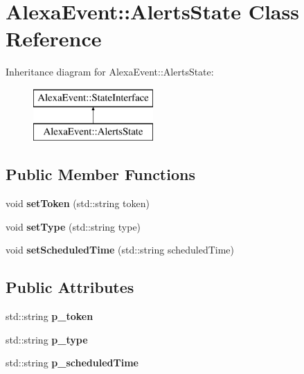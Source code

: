 \hypertarget{classAlexaEvent_1_1AlertsState}{}\section{Alexa\+Event\+:\+:Alerts\+State Class Reference}
\label{classAlexaEvent_1_1AlertsState}
Inheritance diagram for Alexa\+Event\+:\+:Alerts\+State\+:\begin{figure}[H]
\begin{center}
\leavevmode
\includegraphics[height=2.000000cm]{db/d5c/classAlexaEvent_1_1AlertsState}
\end{center}
\end{figure}
\subsection*{Public Member Functions}
\begin{DoxyCompactItemize}
\item 
\mbox{\label{classAlexaEvent_1_1AlertsState_a4fac87f4b2189d9c48388423e35fdccf}} 
void {\bfseries set\+Token} (std\+::string token)
\item 
\mbox{\label{classAlexaEvent_1_1AlertsState_a5e77db6f161f7b8749262cb673e329cd}} 
void {\bfseries set\+Type} (std\+::string type)
\item 
\mbox{\label{classAlexaEvent_1_1AlertsState_ae3dab79db155ebe5e127020706e7dc67}} 
void {\bfseries set\+Scheduled\+Time} (std\+::string scheduled\+Time)
\end{DoxyCompactItemize}
\subsection*{Public Attributes}
\begin{DoxyCompactItemize}
\item 
\mbox{\label{classAlexaEvent_1_1AlertsState_ab201bbf8df1bd53975c2673f3567099a}} 
std\+::string {\bfseries p\+\_\+token}
\item 
\mbox{\label{classAlexaEvent_1_1AlertsState_a52afef935178c7051926bcd34759d787}} 
std\+::string {\bfseries p\+\_\+type}
\item 
\mbox{\label{classAlexaEvent_1_1AlertsState_a82b77e69e4951a5c8d27d9439dedd36b}} 
std\+::string {\bfseries p\+\_\+scheduled\+Time}
\end{DoxyCompactItemize}
